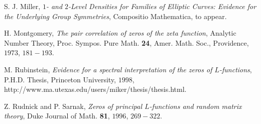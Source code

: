 \documentclass{compositio}
\begin{document}
\begin{thebibliography}{PTW02}
\newblock S. J. Miller, \emph{$1$- and $2$-Level Densities for Families of Elliptic
Curves: Evidence for the Underlying Group Symmetries}, Compositio
Mathematica, to appear.

\newblock H. Montgomery, \emph{The pair correlation of zeros of the zeta
function}, Analytic Number Theory, Proc. Sympos. Pure Math.
\textbf{24}, Amer. Math. Soc., Providence, $1973$, $181-193$.

\newblock M. Rubinstein, \emph{Evidence for a spectral
interpretation of the zeros of $L$-functions}, P.H.D. Thesis,
Princeton University, $1998$,
http://www.ma.utexas.edu/users/miker/thesis/thesis.html.

\newblock Z. Rudnick and P. Sarnak, \emph{Zeros of principal $L$-functions
 and random matrix theory}, Duke Journal of Math. \textbf{81},
 $1996$, $269-322$.


\end{thebibliography}
\end{document}
